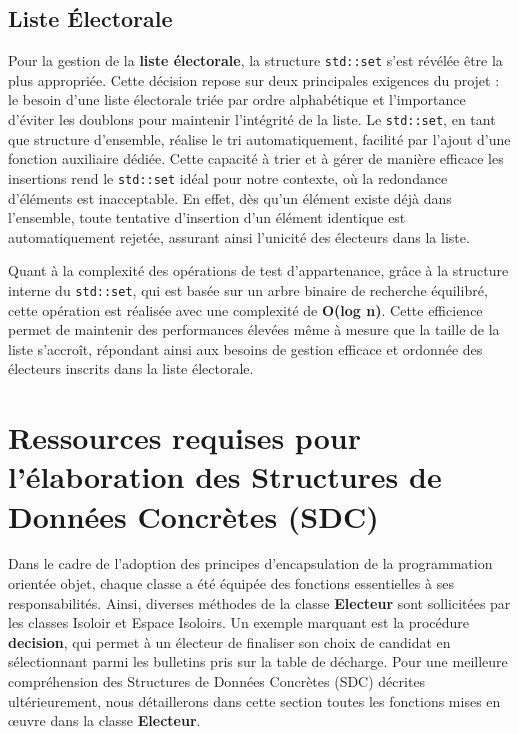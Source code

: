 \documentclass[12pt]{article} %
\begin{document}
\subsection*{Liste Électorale}

Pour la gestion de la \textbf{liste électorale}, la structure \texttt{std::set} s'est révélée être la plus appropriée. Cette décision repose sur deux principales exigences du projet : le besoin d'une liste électorale triée par ordre alphabétique et l'importance d'éviter les doublons pour maintenir l'intégrité de la liste. Le \texttt{std::set}, en tant que structure d'ensemble, réalise le tri automatiquement, facilité par l'ajout d'une fonction auxiliaire dédiée. Cette capacité à trier et à gérer de manière efficace les insertions rend le \texttt{std::set} idéal pour notre contexte, où la redondance d'éléments est inacceptable. En effet, dès qu'un élément existe déjà dans l'ensemble, toute tentative d'insertion d'un élément identique est automatiquement rejetée, assurant ainsi l'unicité des électeurs dans la liste.

Quant à la complexité des opérations de test d'appartenance, grâce à la structure interne du \texttt{std::set}, qui est basée sur un arbre binaire de recherche équilibré, cette opération est réalisée avec une complexité de \textbf{O(log n)}. Cette efficience permet de maintenir des performances élevées même à mesure que la taille de la liste s'accroît, répondant ainsi aux besoins de gestion efficace et ordonnée des électeurs inscrits dans la liste électorale.

\newpage

\section*{Ressources requises pour l'élaboration des Structures de Données Concrètes (SDC)}

Dans le cadre de l'adoption des principes d'encapsulation de la programmation orientée objet, chaque classe a été équipée des fonctions essentielles à ses responsabilités. Ainsi, diverses méthodes de la classe \textbf{Electeur} sont sollicitées par les classes Isoloir et Espace Isoloirs. Un exemple marquant est la procédure \textbf{decision}, qui permet à un électeur de finaliser son choix de candidat en sélectionnant parmi les bulletins pris sur la table de décharge. Pour une meilleure compréhension des Structures de Données Concrètes (SDC) décrites ultérieurement, nous détaillerons dans cette section toutes les fonctions mises en œuvre dans la classe \textbf{Electeur}.
\end{document}
